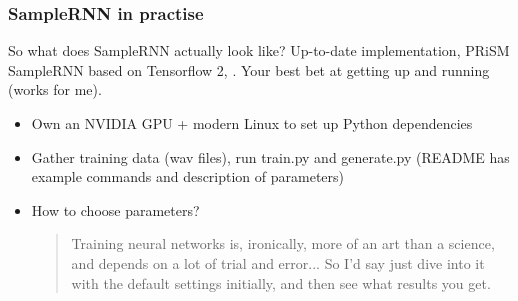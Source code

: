 \documentclass{beamer}
\begin{document}

\begin{frame}
	\frametitle{SampleRNN in practise}
	So what does SampleRNN actually look like? Up-to-date implementation, PRiSM SampleRNN based on Tensorflow 2, . Your best bet at getting up and running (works for me).
	\begin{itemize}
		\item
			Own an NVIDIA GPU + modern Linux to set up Python dependencies
		\item
			Gather training data (wav files), run train.py and generate.py (README has example commands and description of parameters)
		\item
			How to choose parameters?
			\begin{quote}
				Training neural networks is, ironically, more of an art than a science, and depends on a lot of trial and error... So I'd say just dive into it with the default settings initially, and then see what results you get.
			\end{quote}
	\end{itemize}
\end{frame}

\end{document}
